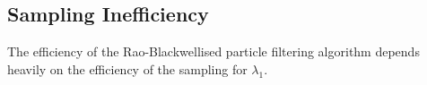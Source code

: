 \documentclass[../main.tex]{subfiles}
\begin{document}
\subsection{Sampling Inefficiency}

The efficiency of the Rao-Blackwellised particle filtering algorithm depends heavily on the efficiency of the sampling for $\lambda_1$. 
\end{document}
